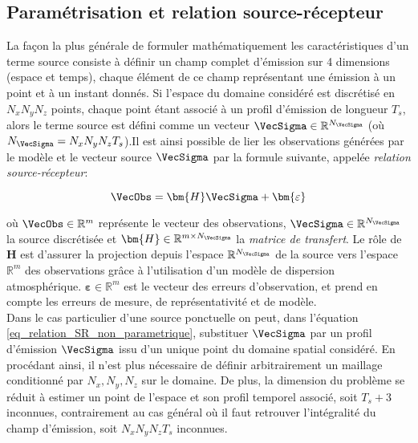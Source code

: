 
	\subsection{Paramétrisation et relation source-récepteur}
	
	La façon la plus générale de formuler mathématiquement les caractéristiques d'un terme source consiste à définir un champ complet d'émission sur 4 dimensions (espace et temps), chaque élément de ce champ représentant une émission à un point et à un instant donnés. Si l'espace du domaine considéré est discrétisé en $N_xN_yN_z$ points, chaque point étant associé à un profil d'émission de longueur $T_s$, alors le terme source est défini comme un vecteur $\VecSigma \in \mathbb{R}^{N_\VecSigma}$ (où $N_\VecSigma = N_xN_yN_zT_s$).Il est ainsi possible de lier les observations générées par le modèle et le vecteur source $\VecSigma$ par la formule suivante, appelée \textit{relation source-récepteur}:
	
	
	\begin{equation}
		\label{eq_relation_SR_non_parametrique}
		\VecObs = \bm{H}\VecSigma + \bm{\varepsilon}
	\end{equation}
	
	où $\VecObs \in \mathbb{R}^m$ représente le vecteur des observations, $\VecSigma \in \mathbb{R}^{N_\VecSigma}$ la source discrétisée et $\bm{H} \in \mathbb{R}^{m \times N_\VecSigma}$  la \textit{matrice de transfert}. Le rôle de $\bm{H}$ est d'assurer la projection depuis l'espace $\mathbb{R}^{N_\VecSigma}$  de la source vers l'espace $\mathbb{R}^m$ des observations grâce à l'utilisation d'un modèle de dispersion atmosphérique. $\bm{\varepsilon} \in \mathbb{R}^m$ est le vecteur des erreurs d'observation, et prend en compte les erreurs de mesure, de représentativité et de modèle. \\
	
	Dans le cas particulier d'une source ponctuelle on peut, dans l'équation \eqref{eq_relation_SR_non_parametrique}, substituer $\VecSigma$ par un profil d'émission $\VecSigma$ issu d'un unique point du domaine spatial considéré. En procédant ainsi, il n'est plus nécessaire de définir arbitrairement un maillage conditionné par $N_x, N_y, N_z$  sur le domaine. De plus, la dimension du problème se réduit à estimer un point de l'espace et son profil temporel associé, soit $T_s + 3$ inconnues, contrairement au cas général où il faut retrouver l'intégralité du champ d'émission, soit $N_xN_yN_zT_s$ inconnues.\\
	
